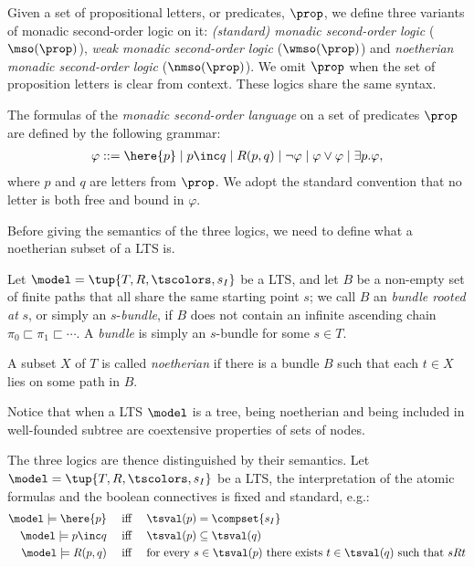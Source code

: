 Given a set of propositional letters, or predicates, $\prop$, we define three variants of monadic second-order logic on it:
\emph{(standard) monadic second-order logic} ($\mso(\prop)$),
\emph{weak monadic second-order logic} ($\wmso(\prop)$) and
\emph{noetherian monadic second-order logic} ($\nmso(\prop)$).
We omit  $\prop$ when the set of proposition letters is clear from context. 
These logics share the same syntax.
\begin{definition}\label{def:mso}
The formulas of the \emph{monadic second-order
language} on a set of predicates $\prop$ are defined by the following grammar:
%
\begin{eqnarray*}\label{EQ_mso}
  \varphi ::= \here{p} \mid p \inc q \mid R(p,q) \mid \lnot\varphi \mid \varphi\lor\varphi \mid \exists p.\varphi,
\end{eqnarray*}
where $p$ and $q$ are letters from $\prop$.
We  adopt the standard convention that no letter is both free and bound in
$\varphi$.
\end{definition}

Before giving the semantics of the three logics, we need to define what a noetherian subset of a LTS is. 
\begin{definition}
\label{d:bundle1}
Let $\model = \tup{T,R,\tscolors, s_I}$ be a LTS, and let $B$ be a non-empty set of 
finite paths that all share the same starting point $s$; we call $B$ an 
\emph{bundle rooted at} $s$, or simply an $s$-\emph{bundle}, if $B$ does not
contain an infinite ascending chain $\pi_{0} \sqsubset \pi_{1} \sqsubset 
\cdots.$
A \emph{bundle} is simply an $s$-bundle for some $s \in T$.

A subset $X$ of $T$ is called \emph{noetherian} if there is a bundle $B$ such
that each $t \in X$ lies on some path in $B$.
\end{definition}

Notice that when a LTS $\model$ is a tree, being noetherian and being included in well-founded subtree are coextensive properties of sets of nodes.

The three logics are thence distinguished by their semantics. 
Let  $\model = \tup{T,R,\tscolors, s_I}$ be a LTS, the interpretation of the
atomic formulas and the boolean connectives is fixed and standard, e.g.:
\begin{align*}
\model \models \here{p} & \quad\text{ iff }\quad  \tsval(p) = \compset{s_I} \\
\model \models p \inc q & \quad\text{ iff }\quad  \tsval(p) \subseteq \tsval(q) \\
\model \models R(p,q) & \quad\text{ iff }\quad  \text{for every $s\in \tsval(p)$ there exists $t\in \tsval(q)$ such that $sRt$} 
\end{align*}

